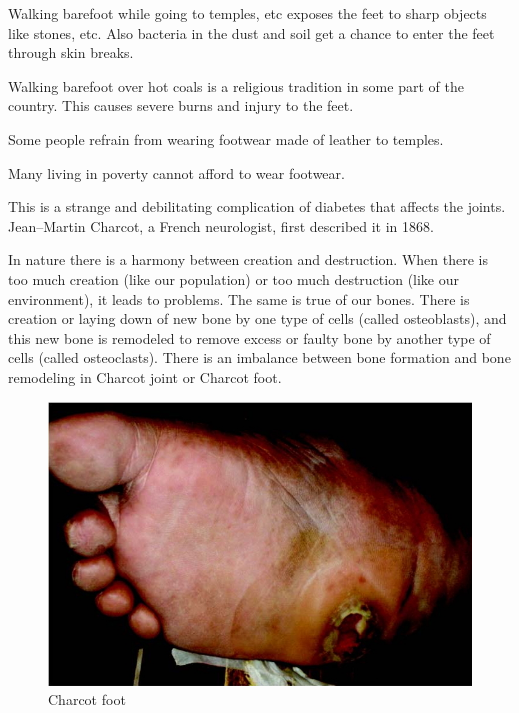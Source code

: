 \item Walking barefoot while going to temples, etc exposes the feet to sharp objects like stones, etc. Also bacteria in the dust and soil get a chance to enter the feet through skin breaks.

 \item Walking barefoot over hot coals is a religious tradition in some part of the country. This causes severe burns and injury to the feet.

 \item Some people refrain from wearing footwear made of leather to temples.

 \item Many living in poverty cannot afford to wear footwear.


This is a strange and debilitating complication of diabetes that affects the joints. Jean–Martin Charcot, a French neurologist, first described it in 1868.

In nature there is a harmony between creation and destruction. When there is too much creation (like our population) or too much destruction (like our environment), it leads to problems. The same is true of our bones. There is creation or laying down of new bone by one type of cells (called osteoblasts), and this new bone is remodeled to remove excess or faulty bone by another type of cells (called osteoclasts). There is an imbalance between bone formation and bone remodeling in Charcot joint or Charcot foot.

\begin{figure}
\includegraphics{images/071.jpg}
\caption{Charcot foot}
\end{figure}


